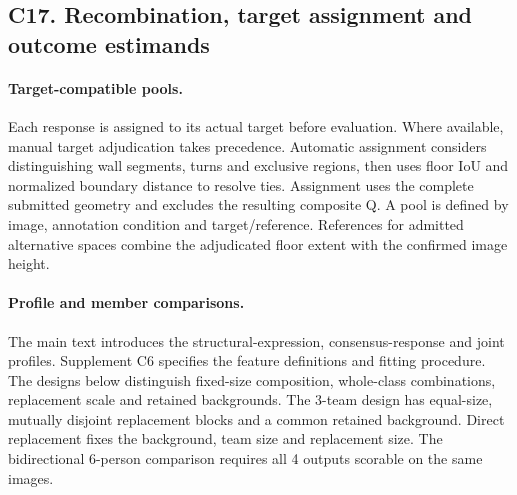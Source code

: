 \subsection*{C17. Recombination, target assignment and outcome estimands}

\paragraph{Target-compatible pools.}
Each response is assigned to its actual target before evaluation. Where available, manual target adjudication takes precedence. Automatic assignment considers distinguishing wall segments, turns and exclusive regions, then uses floor IoU and normalized boundary distance to resolve ties. Assignment uses the complete submitted geometry and excludes the resulting composite Q. A pool is defined by image, annotation condition and target/reference. References for admitted alternative spaces combine the adjudicated floor extent with the confirmed image height.

\paragraph{Profile and member comparisons.}
The main text introduces the structural-expression, consensus-response and joint profiles. Supplement C6 specifies the feature definitions and fitting procedure. The designs below distinguish fixed-size composition, whole-class combinations, replacement scale and retained backgrounds. The 3-team design has equal-size, mutually disjoint replacement blocks and a common retained background. Direct replacement fixes the background, team size and replacement size. The bidirectional 6-person comparison requires all 4 outputs scorable on the same images.

